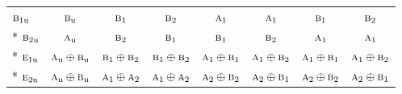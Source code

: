 \documentclass[10pt,a4paper]{article}
\numberwithin{equation}{section}
\newcommand{\irr}[1]{\text{\normalfont\scshape #1}}
\newcommand{\ptag}[1]{\mathrm{#1}}
\begin{document}
{\begin{longtable}{@{}lccccccc@{}}
$\irr{b}_{1\ptag{u}}$ & $\irr{b}_{\ptag{u}}$ & $\irr{b}_{1}$ & $\irr{b}_{2}$ & $\irr{a}_{1}$ & $\irr{a}_{1}$ & $\irr{b}_{1}$ & $\irr{b}_{2}$\\*
$\irr{b}_{2\ptag{u}}$ & $\irr{a}_{\ptag{u}}$ & $\irr{b}_{2}$ & $\irr{b}_{1}$ & $\irr{b}_{1}$ & $\irr{b}_{2}$ & $\irr{a}_{1}$ & $\irr{a}_{1}$\\*
$\irr{e}_{1\ptag{u}}$ & $\irr{a}_{\ptag{u}}\oplus \irr{b}_{\ptag{u}}$ & $\irr{b}_{1}\oplus \irr{b}_{2}$ & $\irr{b}_{1}\oplus \irr{b}_{2}$ & $\irr{a}_{1}\oplus \irr{b}_{1}$ & $\irr{a}_{1}\oplus \irr{b}_{2}$ & $\irr{a}_{1}\oplus \irr{b}_{1}$ & $\irr{a}_{1}\oplus \irr{b}_{2}$\\*
$\irr{e}_{2\ptag{u}}$ & $\irr{a}_{\ptag{u}}\oplus \irr{b}_{\ptag{u}}$ & $\irr{a}_{1}\oplus \irr{a}_{2}$ & $\irr{a}_{1}\oplus \irr{a}_{2}$ & $\irr{a}_{2}\oplus \irr{b}_{2}$ & $\irr{a}_{2}\oplus \irr{b}_{1}$ & $\irr{a}_{2}\oplus \irr{b}_{2}$ & $\irr{a}_{2}\oplus \irr{b}_{1}$\\
\bottomrule\end{longtable}}
\end{document}
